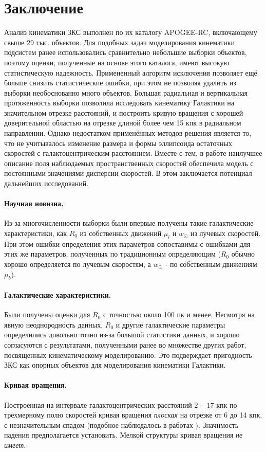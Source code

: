 \documentclass{matmex-diploma-custom}
\begin{document}
\section*{Заключение}
Анализ кинематики ЗКС выполнен по их каталогу APOGEE-RC, включающему свыше 29 тыс. объектов. Для подобных задач моделирования кинематики подсистем ранее использовались сравнительно небольшие выборки объектов, поэтому оценки, полученные на основе этого каталога, имеют высокую статистическую надежность. Примененный алгоритм исключения позволяет ещё больше снизить статистические ошибки, при этом не позволяя удалить из выборки необоснованно много объектов. Большая радиальная и вертикальная протяженность выборки позволила исследовать кинематику Галактики на значительном отрезке расстояний, и построить кривую вращения с хорошей доверительной областью на отрезке длиной более чем 15 кпк в радиальном направлении. Однако недостатком применённых методов решения является то, что не учитывалось изменение размера и формы эллипсоида остаточных скоростей с галактоцентрическим расстоянием. Вместе с тем, в работе \cite{Rastorguev} наилучшее описание поля наблюдаемых пространственных скоростей обеспечила модель с постоянными значениями дисперсии скоростей. В этом заключается потенциал дальнейших исследований.
\paragraph{Научная новизна.} Из-за многочисленности выборки были впервые получены такие галактические характеристики, как $R_0$ из собственных движений $\mu_l$ и $w_{\odot}$ из лучевых скоростей. При этом ошибки определения этих параметров сопоставимы с ошибками для этих же параметров, полученных по традиционным определяющим ($R_0$ обычно хорошо определяется по лучевым скоростям, а $w_\odot$ - по собственным движениям $\mu_b$).
\paragraph{Галактические характеристики.} Были получены оценки для $R_0$ с точностью около 100 пк и менее. Несмотря на явную неоднородность данных, $R_0$ и другие галактические параметры определились довольно точно из-за большой статистики данных, и хорошо согласуются с результатами, полученными ранее во множестве других работ, посвященных кинематическому моделированию. Это подверждает пригодность ЗКС как опорных объектов для моделирования кинематики Галактики.
\paragraph{Кривая вращения.} Построенная на интервале галактоцентрических расстояний $2-17$ кпк по трехмерному полю скоростей кривая вращения \textit{плоская} на отрезке от 6 до 14 кпк, с незначительным спадом (подобное наблюдалось в работах \cite{Rastorguev} \cite{Baikbob}). Значимость падения предполагается установить. Мелкой структуры кривая вращения \textit{не имеет}.
\end{document}
